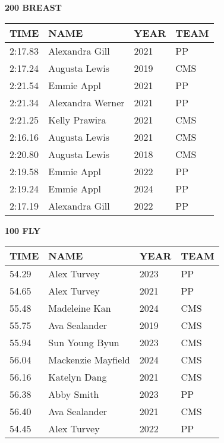\vspace{0.4cm}

\begin{minipage}[t]{0.48\textwidth}
\centering
\textbf{200 BREAST}\\[0.05cm]
\begin{tabular}{@{}p{1.8cm}p{2.8cm}p{1.2cm}p{1.4cm}@{}}
\hline
\textbf{TIME} & \textbf{NAME} & \textbf{YEAR} & \textbf{TEAM} \\
\hline
2:17.83 & Alexandra Gill & 2021 & PP \\
2:17.24 & Augusta Lewis & 2019 & CMS \\
2:21.54 & Emmie Appl & 2021 & PP \\
2:21.34 & Alexandra Werner & 2021 & PP \\
2:21.25 & Kelly Prawira & 2021 & CMS \\
2:16.16 & Augusta Lewis & 2021 & CMS \\
2:20.80 & Augusta Lewis & 2018 & CMS \\
2:19.58 & Emmie Appl & 2022 & PP \\
2:19.24 & Emmie Appl & 2024 & PP \\
2:17.19 & Alexandra Gill & 2022 & PP \\
\hline
\end{tabular}
\end{minipage}\hfill
\begin{minipage}[t]{0.48\textwidth}
\centering
\textbf{100 FLY}\\[0.05cm]
\begin{tabular}{@{}p{1.8cm}p{2.8cm}p{1.2cm}p{1.4cm}@{}}
\hline
\textbf{TIME} & \textbf{NAME} & \textbf{YEAR} & \textbf{TEAM} \\
\hline
54.29 & Alex Turvey & 2023 & PP \\
54.65 & Alex Turvey & 2021 & PP \\
55.48 & Madeleine Kan & 2024 & CMS \\
55.75 & Ava Sealander & 2019 & CMS \\
55.94 & Sun Young Byun & 2023 & CMS \\
56.04 & Mackenzie Mayfield & 2024 & CMS \\
56.16 & Katelyn Dang & 2021 & CMS \\
56.38 & Abby Smith & 2023 & PP \\
56.40 & Ava Sealander & 2021 & CMS \\
54.45 & Alex Turvey & 2022 & PP \\
\hline
\end{tabular}
\end{minipage}

